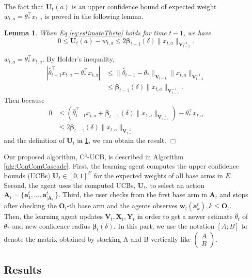 \documentclass{article}
\newcommand{\bbeta}{\boldsymbol{\beta}}
\newcommand{\bA}{\mathbf{A}}
\newcommand{\ba}{\mathbf{a}}
\newcommand{\bO}{\mathbf{O}}
\newcommand{\bU}{\mathbf{U}}
\newcommand{\bV}{\mathbf{V}}
\newcommand{\bw}{\mathbf{w}}
\newcommand{\bX}{\mathbf{X}}
\newcommand{\bY}{\mathbf{Y}}
\newcommand{\abs}[1]{\left| #1 \right|}
\newcommand{\norm}[1]{\| #1 \|}
\newtheorem{lemma}[theorem]{Lemma}%
\newenvironment{proof}{\noindent {\textbf{Proof. }}}{$\Box$ \medskip}
\begin{document}
The fact that $\bU_t(a)$ is an upper confidence bound of expected weight $w_{t, a} = \theta_*^{\top} x_{t,a}$ is proved in the following lemma.
\begin{lemma} %
  \label{lem:estimateU}
  When Eq.\eqref{eq:estimateTheta} holds for time $t-1$, we have
  $$
    0 \leq \bU_t(a) - w_{t,a} \leq 2 \bbeta_{t-1}(\delta)\norm{x_{t,a}}_{\bV_{t-1}^{-1}}.
  $$
\end{lemma}
\begin{proof}
	$w_{t,a} = \theta_*^{\top} x_{t,a}$. By Holder's inequality,
	\begin{align*}
		\abs{\hat{\theta}_{t-1}^{\top}x_{t,a} - \theta_{\ast}^{\top}x_{t,a}} &\leq \norm{\hat{\theta}_{t-1} - \theta_{\ast}}_{\bV_{t-1}} \norm{x_{t,a}}_{\bV_{t-1}^{-1}} \\
		&\leq \bbeta_{t-1}(\delta)\norm{x_{t,a}}_{\bV_{t-1}^{-1}}.
	\end{align*}
	Then because
	\begin{align*}
		0 &\leq (\hat{\theta}_{t-1}^{\top}x_{t,a} + \bbeta_{t-1}(\delta)\norm{x_{t,a}}_{\bV_{t-1}^{-1}}) - \theta_{\ast}^{\top}x_{t,a} \\
		&\leq 2 \bbeta_{t-1}(\delta)\norm{x_{t,a}}_{\bV_{t-1}^{-1}}
	\end{align*}
	and the definition of $\bU_t$ in \ref{lem:estimateU}, we can obtain the result.
\end{proof}

Our proposed algorithm, C$^3$-UCB, is described in Algorithm \ref{alg:ConComCascade}. First, the learning agent computes the upper confidence bounds (UCBs) $\bU_t \in [0,1]^{E}$ for the expected weights of all base arms in $E$. Second, the agent uses the computed UCBs, $\bU_t$, to select an action $\bA_t = \{\ba_{1}^t,..., \ba_{\abs{\bA_t}}^t \}$. Third, the user checks from the first base arm in $\bA_t$ and stops after checking the $\bO_t$-th base arm and the agents observes $\bw_t(\ba_k^t), k\leq \bO_t$. Then, the learning agent updates $\bV_t, \bX_t, \bY_t$ in order to get a newer estimate $\hat{\theta}_t$ of $\theta_*$ and new confidence radius $\bbeta_t(\delta)$. In this part, we use the notation $[A; B]$ to denote the matrix obtained by stacking A and B vertically like $\begin{pmatrix} A\\ B\end{pmatrix}$.

\subsection{Results}
\end{document}
